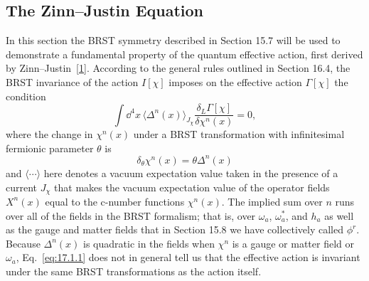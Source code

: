 \subsection{The Zinn--Justin Equation}
\label{sec:17.1}

In this section the BRST symmetry described in Section 15.7 will be used to demonstrate a fundamental property of the quantum effective action, first derived by Zinn--Justin~\hyperref[ch17-ref-1]{[1]}. According to the general rules outlined in Section 16.4, the BRST invariance of the action $I[\chi]$ imposes on the effective action $\Gamma[\chi]$ the condition
\begin{equation}
\int \dd^4x\,\langle\Delta^n(x)\rangle_{J_\chi}
\frac{\delta_L\Gamma[\chi]}{\delta\chi^n(x)}=0,
\tag{17.1.1}\label{eq:17.1.1}
\end{equation}
where the change in $\chi^n(x)$ under a BRST transformation with infinitesimal fermionic parameter $\theta$ is
\begin{equation}
\delta_\theta\chi^n(x)=\theta\Delta^n(x)
\tag{17.1.2}\label{eq:17.1.2}
\end{equation}
and $\langle\cdots\rangle$ here denotes a vacuum expectation value taken in the presence of a current $J_\chi$ that makes the vacuum expectation value of the operator fields $X^n(x)$ equal to the c-number functions $\chi^n(x)$. The implied sum over $n$ runs over all of the fields in the BRST formalism; that is, over $\omega_a$, $\omega_a^*$, and $h_a$ as well as the gauge and matter fields that in Section 15.8 we have collectively called $\phi^r$. Because $\Delta^n(x)$ is quadratic in the fields when $\chi^n$ is a gauge or matter field or $\omega_a$, Eq.~\eqref{eq:17.1.1} does not in general tell us that the effective action is invariant under the same BRST transformations as the action itself.

